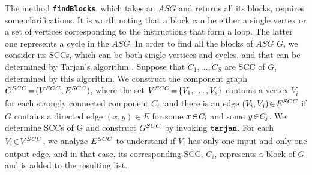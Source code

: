 \documentclass[prodmode,acmtocl]{acmsmall}
\def\ok#1{\mbox{\raisebox{0ex}[1ex][1ex]{$#1$}}}
\newcommand{\0}{\mbox{\bf 0}}
\def\ok#1{\mbox{\raisebox{0ex}[1ex][1ex]{$#1$}}}
\begin{document}
{{  The method \textbf{\texttt{findBlocks}}, which takes an $ASG$ and
  returns all its blocks, requires some clarifications. It is worth
  noting that a block can be either a single vertex or a set of
  vertices corresponding to the instructions that form a loop. The
  latter one represents a cycle in the $ASG$. In order to find all the
  blocks of $ASG$ $G$, we consider its SCCs, which can be both single
  vertices and cycles, and that can be determined by Tarjan's
  algorithm \cite{Tarjan}. Suppose that \small$C_1, \ldots, C_{S}$
  \normalsize are SCC of $G$, determined by this algorithm. We
  construct the component graph \small$\ok{G^{SCC}\!=\!(V^{SCC},
    E^{SCC})}$\normalsize, where the set \small$\ok{V^{SCC}\!=\!\{V_1,
    \ldots, V_s\}}$ \normalsize contains a vertex \small$V_i$
  \normalsize for each strongly connected component
  \small$C_i$\normalsize, and there is an edge \small$\ok{(V_i,
    V_j)\!\in\!E^{SCC}}$ \normalsize if $G$ contains a directed edge
  $(x, y)\!\in\!E$ for some $x\!\in\!\mbox{\small$C_i$\normalsize}$
  and some $y\!\in\!\mbox{\small$C_j$\normalsize}$. We determine SCCs
  of G and construct \small$\ok{G^{SCC}}$ \normalsize by invoking
  $\mbox{\textbf{\texttt{tarjan}}}$. For each
  \small$\ok{V_i\!\in\!V^{SCC}}$\normalsize, we analyze
  \small$\ok{E^{SCC}}$ \normalsize to understand if \small$V_i$
  \normalsize has only one input and only one output edge, and in that
  case, its corresponding SCC, \small$C_i$\normalsize, represents a
  block of $G$ and is added to the resulting list.\\

}}
\end{document}
